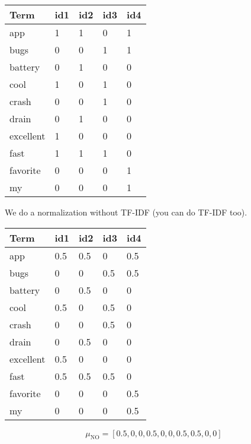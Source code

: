 \documentclass[11pt,a4paper]{report}
\begin{document}
\begin{multicols*}{2}
\begin{center}
\begin{tabular}{ | l | l l l l |} 
    \hline
    Term      & id1 & id2 & id3 & id4 \\ \hline
    app       & 1   & 1   & 0   & 1   \\
    bugs      & 0   & 0   & 1   & 1   \\
    battery   & 0   & 1   & 0   & 0   \\
    cool      & 1   & 0   & 1   & 0   \\
    crash     & 0   & 0   & 1   & 0   \\
    drain     & 0   & 1   & 0   & 0   \\
    excellent & 1   & 0   & 0   & 0   \\
    fast      & 1   & 1   & 1   & 0   \\
    favorite  & 0   & 0   & 0   & 1   \\
    my        & 0   & 0   & 0   & 1   \\
    \hline
\end{tabular}
\end{center}

\noindent We do a normalization without TF-IDF (you can do TF-IDF too). 

\begin{center}
\begin{tabular}{ | l | l l l l |} 
    \hline
    Term      & id1 & id2 & id3 & id4 \\ \hline
    app       & 0.5 & 0.5 & 0   & 0.5 \\
    bugs      & 0   & 0   & 0.5 & 0.5 \\
    battery   & 0   & 0.5 & 0   & 0   \\
    cool      & 0.5 & 0   & 0.5 & 0   \\
    crash     & 0   & 0   & 0.5 & 0   \\
    drain     & 0   & 0.5 & 0   & 0   \\
    excellent & 0.5 & 0   & 0   & 0   \\
    fast      & 0.5 & 0.5 & 0.5 & 0   \\
    favorite  & 0   & 0   & 0   & 0.5 \\
    my        & 0   & 0   & 0   & 0.5 \\
    \hline
\end{tabular}
\end{center}

$$\mu_{\text{NO}} = [0.5, 0, 0, 0.5, 0, 0, 0.5, 0.5, 0, 0]$$


\end{multicols*}
\end{document}
